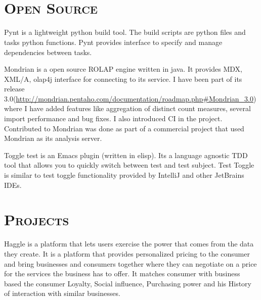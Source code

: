\begin{resume}
\begin{formatb}
  \\
  \body\\
\end{formatb}

\section{\textsc{Open Source}}

\begin{position}
Pynt is a lightweight python build tool. The build scripts are python files and tasks python functions. Pynt provides interface to specify and manage dependencies between tasks. 
\end{position}

\begin{position}
Mondrian is a open source ROLAP engine written in java. It provides MDX, XML/A, olap4j interface for connecting to its service. I have been part of its release 3.0(\url{http://mondrian.pentaho.com/documentation/roadmap.php#Mondrian_3.0}) where I have added features like aggregation of distinct count measures, several import performance and bug fixes. I also introduced CI in the project. Contributed to Mondrian  was done as part of a commercial project that used Mondrian as its analysis server.
\end{position}

\begin{position}
Toggle test is an Emacs plugin (written in elisp). Its a language agnostic TDD tool that allows you to quickly switch between test and test subject. Test Toggle is similar to test toggle functionality provided by IntelliJ and other JetBrains IDEs.
\end{position}

\section{\textsc{Projects}}

\begin{position}
Haggle is a platform that lets users exercise the power that comes from the data they create. It is a platform that provides personalized pricing to the consumer and bring businesses and consumers together where they can negotiate on a price for the services the business has to offer. It matches consumer with business based the consumer Loyalty, Social influence, Purchasing power and his History of interaction with similar businesses.


\end{position}
\end{resume}
